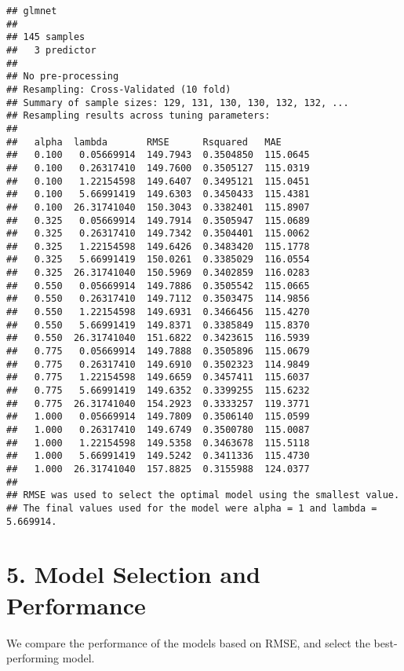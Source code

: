 \documentclass[
]{article}
\begin{document}
\begin{verbatim}
## glmnet 
## 
## 145 samples
##   3 predictor
## 
## No pre-processing
## Resampling: Cross-Validated (10 fold) 
## Summary of sample sizes: 129, 131, 130, 130, 132, 132, ... 
## Resampling results across tuning parameters:
## 
##   alpha  lambda       RMSE      Rsquared   MAE     
##   0.100   0.05669914  149.7943  0.3504850  115.0645
##   0.100   0.26317410  149.7600  0.3505127  115.0319
##   0.100   1.22154598  149.6407  0.3495121  115.0451
##   0.100   5.66991419  149.6303  0.3450433  115.4381
##   0.100  26.31741040  150.3043  0.3382401  115.8907
##   0.325   0.05669914  149.7914  0.3505947  115.0689
##   0.325   0.26317410  149.7342  0.3504401  115.0062
##   0.325   1.22154598  149.6426  0.3483420  115.1778
##   0.325   5.66991419  150.0261  0.3385029  116.0554
##   0.325  26.31741040  150.5969  0.3402859  116.0283
##   0.550   0.05669914  149.7886  0.3505542  115.0665
##   0.550   0.26317410  149.7112  0.3503475  114.9856
##   0.550   1.22154598  149.6931  0.3466456  115.4270
##   0.550   5.66991419  149.8371  0.3385849  115.8370
##   0.550  26.31741040  151.6822  0.3423615  116.5939
##   0.775   0.05669914  149.7888  0.3505896  115.0679
##   0.775   0.26317410  149.6910  0.3502323  114.9849
##   0.775   1.22154598  149.6659  0.3457411  115.6037
##   0.775   5.66991419  149.6352  0.3399255  115.6232
##   0.775  26.31741040  154.2923  0.3333257  119.3771
##   1.000   0.05669914  149.7809  0.3506140  115.0599
##   1.000   0.26317410  149.6749  0.3500780  115.0087
##   1.000   1.22154598  149.5358  0.3463678  115.5118
##   1.000   5.66991419  149.5242  0.3411336  115.4730
##   1.000  26.31741040  157.8825  0.3155988  124.0377
## 
## RMSE was used to select the optimal model using the smallest value.
## The final values used for the model were alpha = 1 and lambda = 5.669914.
\end{verbatim}

\section{5. Model Selection and
Performance}\label{model-selection-and-performance}

We compare the performance of the models based on RMSE, and select the
best-performing model.
\end{document}
